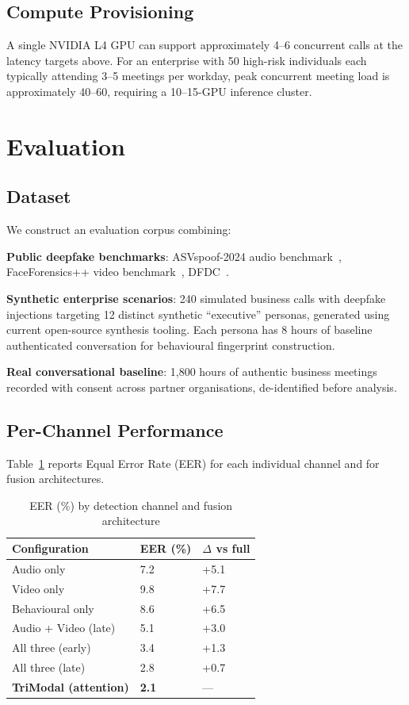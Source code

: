 \documentclass[sigconf,nonacm]{acmart}
\begin{document}
\subsection{Compute Provisioning}

A single NVIDIA L4 GPU can support approximately 4--6 concurrent calls
at the latency targets above. For an enterprise with 50 high-risk
individuals each typically attending 3--5 meetings per workday, peak
concurrent meeting load is approximately 40--60, requiring a
10--15-GPU inference cluster.

\section{Evaluation}

\subsection{Dataset}

We construct an evaluation corpus combining:

\textbf{Public deepfake benchmarks}: ASVspoof-2024 audio
benchmark~\cite{wang2024asvspoof}, FaceForensics++ video
benchmark~\cite{rossler2019faceforensics}, DFDC~\cite{dolhansky2024dfdc}.

\textbf{Synthetic enterprise scenarios}: 240 simulated business
calls with deepfake injections targeting 12 distinct synthetic
``executive'' personas, generated using current open-source synthesis
tooling. Each persona has 8 hours of baseline authenticated
conversation for behavioural fingerprint construction.

\textbf{Real conversational baseline}: 1{,}800 hours of authentic
business meetings recorded with consent across partner organisations,
de-identified before analysis.

\subsection{Per-Channel Performance}

Table~\ref{tab:channels} reports Equal Error Rate (EER) for each
individual channel and for fusion architectures.

\begin{table}[h]
\caption{EER (\%) by detection channel and fusion architecture}
\label{tab:channels}
\small
\begin{tabularx}{\columnwidth}{@{}p{3.0cm}X X@{}}
\toprule
\textbf{Configuration} & \textbf{EER (\%)} & \textbf{$\Delta$ vs full} \\
\midrule
Audio only             & 7.2  & +5.1 \\
Video only             & 9.8  & +7.7 \\
Behavioural only       & 8.6  & +6.5 \\
Audio + Video (late)   & 5.1  & +3.0 \\
All three (early)      & 3.4  & +1.3 \\
All three (late)       & 2.8  & +0.7 \\
\textbf{TriModal (attention)} & \textbf{2.1} & --- \\
\bottomrule
\end{tabularx}
\end{table}
\end{document}
